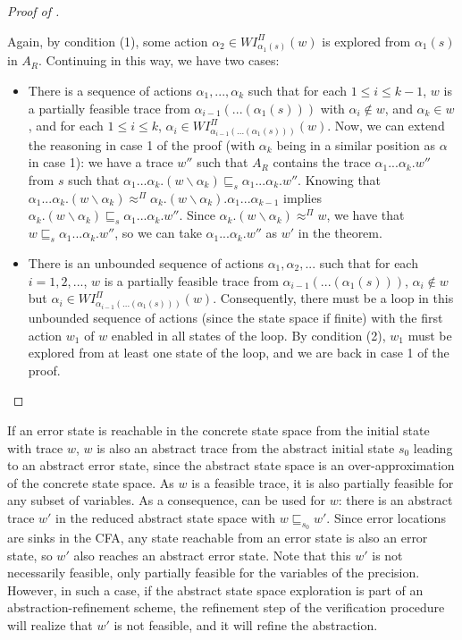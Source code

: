 \documentclass[numbook]{svjour3}
\begin{document}
\begin{proof}[Proof of ]
\begin{enumerate}
		Again, by condition (1), some action $\alpha_2 \in \mathit{WI}_{\alpha_1(s)}^\Pi(w)$ is explored from $\alpha_1(s)$ in $A_R$. Continuing in this way, we have two cases:
		
		\begin{itemize}
			\item There is a sequence of actions $\alpha_1, ..., \alpha_k$ such that for each $1 \le i \le k - 1$, $w$ is a partially feasible trace from $\alpha_{i-1}(...(\alpha_1(s)))$ with $\alpha_i \notin w$, and $\alpha_k \in w$, and for each $1 \le i \le k$, $\alpha_i \in \mathit{WI}_{\alpha_{i-1}(...(\alpha_1(s)))}^\Pi(w)$. Now, we can extend the reasoning in case 1 of the proof (with $\alpha_k$ being in a similar position as $\alpha$ in case 1): we have a trace $w''$ such that $A_R$ contains the trace $\alpha_1...\alpha_k.w''$ from $s$ such that $\alpha_1...\alpha_k.(w \backslash \alpha_k) \sqsubseteq_{s} \alpha_1...\alpha_k.w''$. Knowing that $\alpha_1...\alpha_k.(w \backslash \alpha_k) \approx^\Pi \alpha_k.(w \backslash \alpha_k).\alpha_1...\alpha_{k-1}$ implies $\alpha_k.(w \backslash \alpha_k) \sqsubseteq_{s} \alpha_1...\alpha_k.w''$. Since $\alpha_k.(w \backslash \alpha_k) \approx^\Pi w$, we have that $w \sqsubseteq_{s} \alpha_1...\alpha_k.w''$, so we can take $\alpha_1...\alpha_k.w''$ as $w'$ in the theorem.
			
			\item There is an unbounded sequence of actions $\alpha_1, \alpha_2, ...$ such that for each $i = 1, 2, ...$, $w$ is a partially feasible trace from $\alpha_{i-1}(...(\alpha_1(s)))$, $\alpha_i \notin w$ but $\alpha_i \in \mathit{WI}_{\alpha_{i-1}(...(\alpha_1(s)))}^\Pi(w)$. Consequently, there must be a loop in this unbounded sequence of actions (since the state space if finite) with the first action $w_1$ of $w$ enabled in all states of the loop. By condition (2), $w_1$ must be explored from at least one state of the loop, and we are back in case 1 of the proof.
		\end{itemize}
	\end{enumerate}
\end{proof}

If an error state is reachable in the concrete state space from the initial state with trace $w$, $w$ is also an abstract trace from the abstract initial state $s_0$ leading to an abstract error state, since the abstract state space is an over-approximation of the concrete state space. As $w$ is a feasible trace, it is also partially feasible for any subset of variables. As a consequence,  can be used for $w$: there is an abstract trace $w'$ in the reduced abstract state space with $w \sqsubseteq_{s_0} w'$. Since error locations are sinks in the CFA, any state reachable from an error state is also an error state, so $w'$ also reaches an abstract error state. Note that this $w'$ is not necessarily feasible, only partially feasible for the variables of the precision. However, in such a case, if the abstract state space exploration is part of an abstraction-refinement scheme, the refinement step of the verification procedure will realize that $w'$ is not feasible, and it will refine the abstraction.
\end{document}
